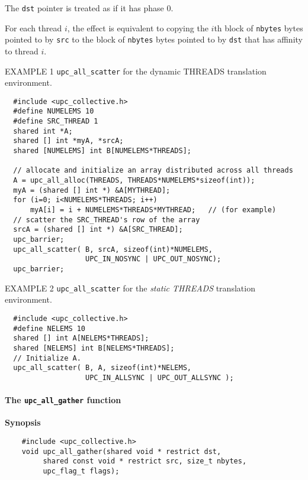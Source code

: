 \np The {\tt dst} pointer is treated as if it has phase 0.

\np For each thread $i$, the effect is equivalent to copying
the $i$th block of {\tt nbytes} bytes pointed to by {\tt src} to
the block of {\tt nbytes} bytes 
pointed to by {\tt dst} that has affinity to thread $i$.

\np EXAMPLE 1 {\tt upc\_all\_scatter} for the {dynamic THREADS} translation
environment.

\begin{verbatim}
  #include <upc_collective.h>
  #define NUMELEMS 10
  #define SRC_THREAD 1
  shared int *A;
  shared [] int *myA, *srcA;
  shared [NUMELEMS] int B[NUMELEMS*THREADS];

  // allocate and initialize an array distributed across all threads
  A = upc_all_alloc(THREADS, THREADS*NUMELEMS*sizeof(int));
  myA = (shared [] int *) &A[MYTHREAD];
  for (i=0; i<NUMELEMS*THREADS; i++)
      myA[i] = i + NUMELEMS*THREADS*MYTHREAD;   // (for example)
  // scatter the SRC_THREAD's row of the array
  srcA = (shared [] int *) &A[SRC_THREAD];
  upc_barrier;
  upc_all_scatter( B, srcA, sizeof(int)*NUMELEMS,
                   UPC_IN_NOSYNC | UPC_OUT_NOSYNC);
  upc_barrier;
\end{verbatim}

\np EXAMPLE 2 {\tt upc\_all\_scatter} for the {\em static THREADS} 
translation environment.

\begin{verbatim}
  #include <upc_collective.h>
  #define NELEMS 10
  shared [] int A[NELEMS*THREADS];
  shared [NELEMS] int B[NELEMS*THREADS];
  // Initialize A.
  upc_all_scatter( B, A, sizeof(int)*NELEMS,
                   UPC_IN_ALLSYNC | UPC_OUT_ALLSYNC );
\end{verbatim}

\paragraph{The {\tt upc\_all\_gather} function}

{\bf Synopsis} 

\npf\vspace{-2.5em} 

\begin{verbatim}
    #include <upc_collective.h>
    void upc_all_gather(shared void * restrict dst,
         shared const void * restrict src, size_t nbytes,
         upc_flag_t flags);
\end{verbatim}

